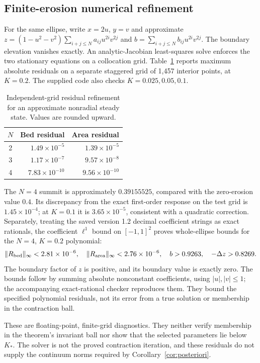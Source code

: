 \documentclass[11pt,a4paper]{article}
\theoremstyle{definition}\newtheorem{definition}[theorem]{Definition}
\theoremstyle{remark}\newtheorem{remark}[theorem]{Remark}
\begin{document}
\subsection*{Finite-erosion numerical refinement}
For the same ellipse, write $x=2u$, $y=v$ and approximate
$z=(1-u^2-v^2)\sum_{i+j\leq N}a_{ij}u^{2i}v^{2j}$ and
$b=\sum_{i+j\leq N}b_{ij}u^{2i}v^{2j}$.
The boundary elevation vanishes exactly. An analytic-Jacobian least-squares
solve enforces the two stationary equations on a collocation grid.
Table~\ref{tab:nonradial} reports maximum absolute residuals on a separate
staggered grid of 1,457 interior points, at $K=0.2$.
The supplied code also checks $K=0.025,0.05,0.1$.
\begin{table}[ht]
\centering
\begin{tabular}{crr}
\toprule
$N$ & Bed residual & Area residual\\
\midrule
2 & $1.49\times10^{-5}$ & $1.39\times10^{-5}$\\
3 & $1.17\times10^{-7}$ & $9.57\times10^{-8}$\\
4 & $7.83\times10^{-10}$ & $9.56\times10^{-10}$\\
\bottomrule
\end{tabular}
\caption{Independent-grid residual refinement for an approximate nonradial steady state. Values are rounded upward.}\label{tab:nonradial}
\end{table}
The $N=4$ summit is approximately $0.39155525$, compared with the
zero-erosion value $0.4$. Its discrepancy from the exact first-order response
on the test grid is $1.45\times10^{-4}$; at $K=0.1$ it is
$3.65\times10^{-5}$, consistent with a quadratic correction.
Separately, treating the saved version 1.2 decimal coefficient strings as exact
rationals, the coefficient $\ell^1$ bound on $[-1,1]^2$ proves whole-ellipse
bounds for the $N=4$, $K=0.2$ polynomial:
\[
 \|R_{\rm bed}\|_\infty<2.81\times10^{-6},\quad
 \|R_{\rm area}\|_\infty<2.76\times10^{-6},\quad
 b>0.9263,\quad-\Delta z>0.8269.
\]
The boundary factor of $z$ is positive, and its boundary value is exactly zero.
The bounds follow by summing absolute nonconstant coefficients, using
$|u|,|v|\leq1$; the accompanying exact-rational checker reproduces them.
They bound the specified polynomial residuals, not its error from a true
solution or membership in the contraction ball.

These are floating-point, finite-grid diagnostics. They neither verify
membership in the theorem's invariant ball nor show that the selected
parameters lie below $K_*$. The solver is not the proved contraction
iteration, and these residuals do not supply the continuum norms required
by Corollary~\ref{cor:posteriori}.
\end{document}
